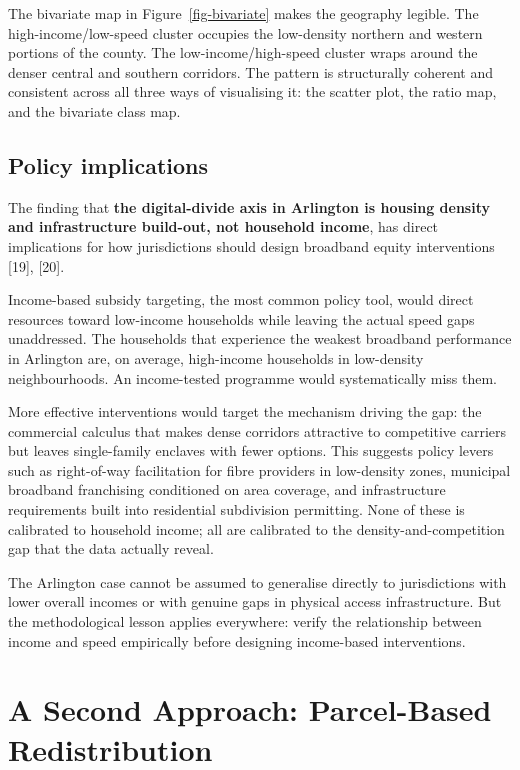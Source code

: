 \documentclass[
  letterpaper,
  DIV=11,
  numbers=noendperiod]{scrreprt}
\begin{document}
The bivariate map in Figure~\ref{fig-bivariate} makes the geography
legible. The high-income/low-speed cluster occupies the low-density
northern and western portions of the county. The low-income/high-speed
cluster wraps around the denser central and southern corridors. The
pattern is structurally coherent and consistent across all three ways of
visualising it: the scatter plot, the ratio map, and the bivariate class
map.

\section{Policy implications}\label{policy-implications}

The finding that \textbf{the digital-divide axis in Arlington is housing
density and infrastructure build-out, not household income}, has direct
implications for how jurisdictions should design broadband equity
interventions {[}19{]}, {[}20{]}.

Income-based subsidy targeting, the most common policy tool, would
direct resources toward low-income households while leaving the actual
speed gaps unaddressed. The households that experience the weakest
broadband performance in Arlington are, on average, high-income
households in low-density neighbourhoods. An income-tested programme
would systematically miss them.

More effective interventions would target the mechanism driving the gap:
the commercial calculus that makes dense corridors attractive to
competitive carriers but leaves single-family enclaves with fewer
options. This suggests policy levers such as right-of-way facilitation
for fibre providers in low-density zones, municipal broadband
franchising conditioned on area coverage, and infrastructure
requirements built into residential subdivision permitting. None of
these is calibrated to household income; all are calibrated to the
density-and-competition gap that the data actually reveal.

The Arlington case cannot be assumed to generalise directly to
jurisdictions with lower overall incomes or with genuine gaps in
physical access infrastructure. But the methodological lesson applies
everywhere: verify the relationship between income and speed empirically
before designing income-based interventions.


\chapter{A Second Approach: Parcel-Based
Redistribution}\label{sec-parcels}
\end{document}

